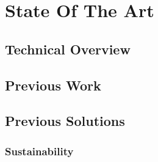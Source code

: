 \chapter{State Of The Art}
\label{cha:state_of_art}


\section{Technical Overview}
\label{sec:state_of_the_art_technical_overview}


\section{Previous Work}
\label{sec:state_of_art_previous_work}

\section{Previous Solutions}
\label{sec:state_of_art_previous_solutions}

\subsection{Sustainability}
\label{subsec:state_of_the_art_previous_solutions_sustainability}